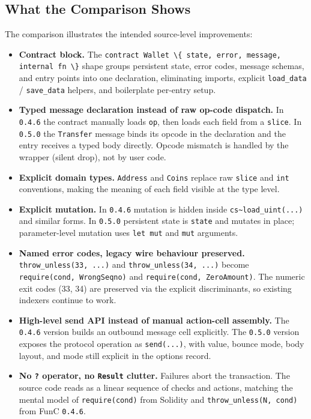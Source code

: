 \documentclass[12pt,oneside]{article}
\begin{document}
\subsection{What the Comparison Shows}
The comparison illustrates the intended source-level improvements:

\begin{itemize}
\item \textbf{Contract block.}
The \verb|contract Wallet \{ state, error, message, internal fn \}|
shape groups persistent state, error codes, message schemas, and entry
points into one declaration, eliminating imports, explicit
\verb|load_data| / \verb|save_data| helpers, and boilerplate per-entry
setup.

\item \textbf{Typed message declaration instead of raw op-code dispatch.}
In \verb|0.4.6| the contract manually loads \verb|op|, then loads each
field from a \verb|slice|. In \verb|0.5.0| the \verb|Transfer| message
binds its opcode in the declaration and the entry receives a typed
body directly. Opcode mismatch is handled by the wrapper (silent drop),
not by user code.

\item \textbf{Explicit domain types.}
\verb|Address| and \verb|Coins| replace raw \verb|slice| and \verb|int|
conventions, making the meaning of each field visible at the type
level.

\item \textbf{Explicit mutation.}
In \verb|0.4.6| mutation is hidden inside \verb|cs~load_uint(...)| and
similar forms. In \verb|0.5.0| persistent state is \verb|state| and
mutates in place; parameter-level mutation uses \verb|let mut| and
\verb|mut| arguments.

\item \textbf{Named error codes, legacy wire behaviour preserved.}
\verb|throw_unless(33, ...)| and \verb|throw_unless(34, ...)| become
\verb|require(cond, WrongSeqno)| and \verb|require(cond, ZeroAmount)|.
The numeric exit codes (33, 34) are preserved via the explicit
discriminants, so existing indexers continue to work.

\item \textbf{High-level send API instead of manual action-cell assembly.}
The \verb|0.4.6| version builds an outbound message cell explicitly.
The \verb|0.5.0| version exposes the protocol operation as
\verb|send(...)|, with value, bounce mode, body layout, and mode still
explicit in the options record.

\item \textbf{No \texttt{?} operator, no \texttt{Result} clutter.}
Failures abort the transaction. The source code reads as a linear
sequence of checks and actions, matching the mental model of
\verb|require(cond)| from Solidity and \verb|throw_unless(N, cond)|
from FunC \verb|0.4.6|.
\end{itemize}
\end{document}
